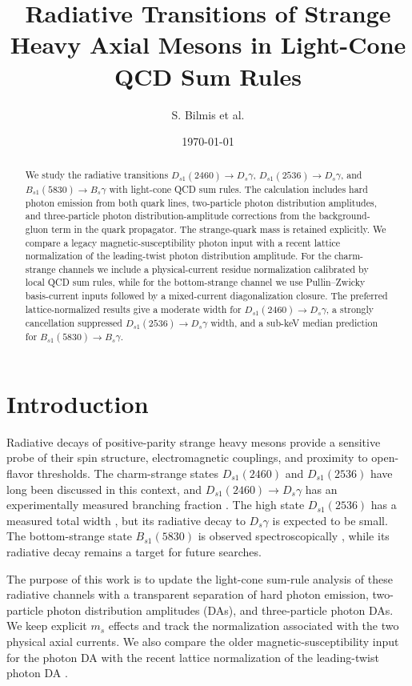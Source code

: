 \documentclass[11pt]{article}
\title{Radiative Transitions of Strange Heavy Axial Mesons in Light-Cone QCD Sum Rules}
\author{S. Bilmis et al.}
\date{\today}
\newcommand{\Ds}{D_s}
\newcommand{\Dsone}{D_{s1}}
\newcommand{\Bs}{B_s}
\newcommand{\Bsone}{B_{s1}}
\begin{document}
\maketitle

\begin{abstract}
We study the radiative transitions
$\Dsone(2460)\to\Ds\gamma$, $\Dsone(2536)\to\Ds\gamma$, and
$\Bsone(5830)\to\Bs\gamma$ with light-cone QCD sum rules.  The calculation
includes hard photon emission from both quark lines, two-particle photon
distribution amplitudes, and three-particle photon distribution-amplitude
corrections from the background-gluon term in the quark propagator.  The
strange-quark mass is retained explicitly.  We compare a legacy
magnetic-susceptibility photon input with a recent lattice normalization of the
leading-twist photon distribution amplitude.  For the charm-strange channels we
include a physical-current residue normalization calibrated by local QCD sum
rules, while for the bottom-strange channel we use Pullin--Zwicky basis-current
inputs followed by a mixed-current diagonalization closure.  The preferred
lattice-normalized results give a
moderate width for $\Dsone(2460)\to\Ds\gamma$, a strongly cancellation
suppressed $\Dsone(2536)\to\Ds\gamma$ width, and a sub-keV median prediction
for $\Bsone(5830)\to\Bs\gamma$.
\end{abstract}

\section{Introduction}

Radiative decays of positive-parity strange heavy mesons provide a sensitive
probe of their spin structure, electromagnetic couplings, and proximity to
open-flavor thresholds.  The charm-strange states $\Dsone(2460)$ and
$\Dsone(2536)$ have long been discussed in this context, and
$\Dsone(2460)\to\Ds\gamma$ has an experimentally measured branching fraction
\cite{BaBar2006}.  The high state $\Dsone(2536)$ has a measured total width
\cite{BaBar2011}, but its radiative decay to $\Ds\gamma$ is expected to be
small.  The bottom-strange state $\Bsone(5830)$ is observed spectroscopically
\cite{CMS2018}, while its radiative decay remains a target for future searches.

The purpose of this work is to update the light-cone sum-rule analysis of
these radiative channels with a transparent separation of hard photon emission,
two-particle photon distribution amplitudes (DAs), and three-particle photon
DAs.  We keep explicit $m_s$ effects and track the normalization associated
with the two physical axial currents.  We also compare the older
magnetic-susceptibility input for the photon DA \cite{Ball:2002ps,Rohrwild2007}
with the recent lattice normalization of the leading-twist photon DA
\cite{Bacchio2024}.
\end{document}
